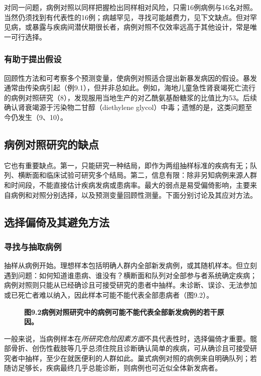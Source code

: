 对同一问题，病例对照以同样把握检出同样相对风险，只需16例病例与16名对照。当然仍须找到有代表性的16例；病越罕见，寻找可能越费力，见下文缺点。但对罕见病，或暴露与疾病间潜伏期很长者，病例对照不仅效率远高于其他设计，常是唯一可行选择。

\subsubsection{有助于提出假设}
回顾性方法和可考察多个预测变量，使病例对照适合提出新暴发病因的假设。暴发通常由传染病引起（例9.1），但并非总如此。例如，海地儿童急性肾衰竭死亡流行的病例对照研究（8），发现服用当地生产的对乙酰氨基酚糖浆的比值比为53。后续确认肾衰竭源于污染物二甘醇（diethylene glycol）中毒；遗憾的是，这类问题至今仍发生（9、10）。

\subsection{病例对照研究的缺点}
它也有重要缺点。第一，只能研究一种结局，即作为两组抽样标准的疾病有无；队列、横断面和临床试验可研究多个结局。第二，信息有限：除非另知病例来源人群和时间段，不能直接估计疾病发病或患病率。最大的弱点是易受偏倚影响，主要来自病例和对照分别选择，以及预测变量回顾性测量。下面分别讨论及其应对方法。

\subsection{选择偏倚及其避免方法}
\subsubsection{寻找与抽取病例}
抽样从病例开始。理想样本包括明确人群内全部新发病例，或其随机样本。但立刻遇到问题：如何知道谁患病、谁没有？横断面和队列对全部参与者系统确定疾病；病例对照则只能从已经确诊且可接受研究的患者中抽样。未诊断、误诊、无法参加或已死亡者难以纳入，因此样本可能不能代表全部患病者（图9.2）。

\begin{figure}[htbp]\centering\chNineSelection
\caption*{\textbf{图9.2\quad 病例对照研究中的病例可能不能代表全部新发病例的若干原因。}}
\end{figure}

一般来说，当病例样本在\emph{所研究危险因素方面}不具代表性时，选择偏倚才重要。髋部骨折、创伤性截肢等几乎总须住院且诊断确认简单的疾病，可从确诊且可接受研究者中抽样，至少在就医便利的人群如此。巢式病例对照的病例来自明确队列；若随访足够长，疾病最终几乎总能诊断，则病例也可近似全体新发病者。


